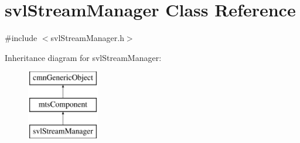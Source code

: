 \hypertarget{classsvl_stream_manager}{\section{svl\-Stream\-Manager Class Reference}
\label{classsvl_stream_manager}
}


{\ttfamily \#include $<$svl\-Stream\-Manager.\-h$>$}

Inheritance diagram for svl\-Stream\-Manager\-:\begin{figure}[H]
\begin{center}
\leavevmode
\includegraphics[height=3.000000cm]{d1/dd6/classsvl_stream_manager}
\end{center}
\end{figure}
